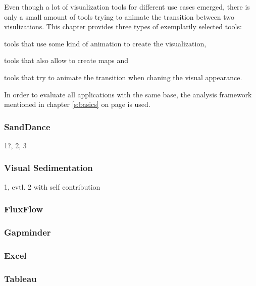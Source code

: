 Even though a lot of visualization tools for different use cases emerged, there is only a small amount of tools trying to animate the transition between two visulizations. This chapter provides three types of exemplarily selected tools:

\begin{enumerate*}
\item tools that use some kind of animation to create the visualization,
\item tools that also allow to create maps and
\item tools that try to animate the transition when chaning the visual appearance.
\end{enumerate*}

In order to evaluate all applications with the same base, the analysis framework mentioned in chapter \ref{s:basics} on page \pageref{s:basics} is used.

\subsubsection{SandDance}
1?, 2, 3

\subsubsection{Visual Sedimentation}
1, evtl. 2 with self contribution


\subsubsection{FluxFlow}

\subsubsection{Gapminder}

\subsubsection{Excel}

\subsubsection{Tableau}

